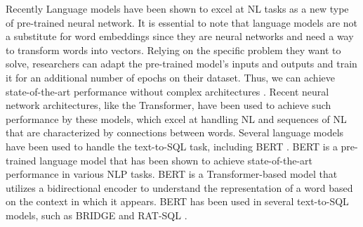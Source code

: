 Recently Language models have been shown to excel at NL tasks as a new type of pre-trained neural network. It is essential to note that language models are not a substitute for word embeddings since they are neural networks and need a way to transform words into vectors.
Relying on the specific problem they want to solve, researchers can adapt the pre-trained model's inputs and outputs and train it for an additional number of epochs on their dataset. Thus, we can achieve state-of-the-art performance without complex architectures \cite{DBLP:journals/corr/abs-1810-04805}. Recent neural network architectures, like the Transformer\cite{https://doi.org/10.48550/arxiv.1706.03762}, have been used to achieve such performance by these models, which excel at handling NL and sequences of NL that are characterized by connections between words. Several language models have been used to handle the text-to-SQL task, including BERT \cite{DBLP:journals/corr/abs-1810-04805}. BERT is a pre-trained language model that has been shown to achieve state-of-the-art performance in various NLP tasks. BERT is a Transformer-based model that utilizes a bidirectional encoder to understand the representation of a word based on the context in which it appears. BERT has been used in several text-to-SQL models, such as BRIDGE \cite{lin_bridging_2020} and RAT-SQL \cite{wang_rat_sql_2021}.




\clearpage

\clearpage

\clearpage


